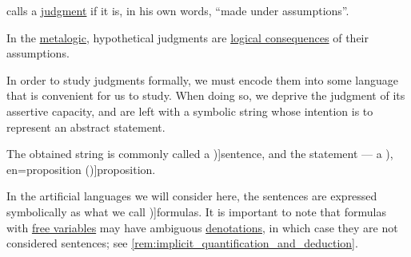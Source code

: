 \begin{concept}\label{con:hypothetical_judgment}
  \textcite[30]{MartinLöf1984IntuitionisticTypeTheory} calls a \hyperref[con:judgment]{judgment}  if it is, in his own words, \enquote{made under assumptions}.
\end{concept}
\begin{comments}
  \item In the \hyperref[con:metalogic]{metalogic}, hypothetical judgments are \hyperref[def:consequence_relation]{logical consequences} of their assumptions.
\end{comments}

\begin{concept}\label{con:proposition}
  In order to study judgments formally, we must encode them into some language that is convenient for us to study. When doing so, we deprive the judgment of its assertive capacity, and are left with a symbolic string whose intention is to represent an abstract statement.

  The obtained string is commonly called a \term[en=sentence (\cite[4]{Kleene2002Logic})]{sentence}, and the statement --- a \term[ru=высказывание (\cite[8]{Эдельман1975Логика}), en=proposition (\cite[4]{Kleene2002Logic})]{proposition}.

  In the artificial languages we will consider here, the sentences are expressed symbolically as what we call \term[en=formula (\cite[4]{Kleene2002Logic})]{formulas}. It is important to note that formulas with \hyperref[con:variable_binding]{free variables} may have ambiguous \hyperref[con:denotation]{denotations}, in which case they are not considered sentences; see \cref{rem:implicit_quantification_and_deduction}.
\end{concept}
